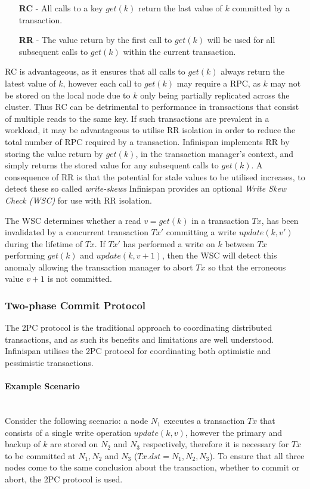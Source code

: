 	        \begin{itemize}
	            \item[\textbf{RC} -] All calls to a key $get(k)$ return the last value of $k$ committed by a transaction.  
	            \item[\textbf{RR} -] The value return by the first call to $get(k)$ will be used for all subsequent calls to $get(k)$ within the current transaction.
	        \end{itemize}   
	        
	        RC is advantageous, as it ensures that all calls to $get(k)$ always return the latest value of $k$, however each call to $get(k)$ may require a RPC, as $k$ may not be stored on the local node due to $k$ only being partially replicated across the cluster. Thus RC can be detrimental to performance in transactions that consist of multiple reads to the same key.  If such transactions are prevalent in a workload, it may be advantageous to utilise RR isolation in order to reduce the total number of RPC required by a transaction.  Infinispan implements RR by storing the value return by $get(k)$, in the transaction manager's context, and simply returns the stored value for any subsequent calls to $get(k)$.  A consequence of RR is that the potential for stale values to be utilised increases, to detect these so called \emph{write-skews}\label{write-skew} Infinispan provides an optional \emph{Write Skew Check (WSC)} for use with RR isolation.  
	        
	        The WSC determines whether a read $v = get(k)$ in a transaction $Tx$, has been invalidated by a concurrent transaction $Tx'$ committing a write $update(k, v')$ during the lifetime of $Tx$.  If $Tx'$ has performed a write on $k$ between $Tx$ performing $get(k)$ and $update(k, v+1)$, then the WSC will detect this anomaly allowing the transaction manager to abort $Tx$ so that the erroneous value $v+1$ is not committed.  

        
	    \subsubsection{Two-phase Commit Protocol}
	       The 2PC protocol is the traditional approach to coordinating distributed transactions, and as such its benefits and limitations are well understood.  Infinispan utilises the 2PC protocol for coordinating both optimistic and pessimistic transactions.  
	       
           \paragraph{Example Scenario} \label{transaction_scenario} \hspace{0pt} \\	       
           Consider the following scenario: a node $N_1$ executes a transaction $Tx$ that consists of a single write operation $update(k, v)$, however the primary and backup of $k$ are stored on $N_2$ and $N_3$ respectively, therefore it is necessary for $Tx$ to be committed at $N_1, N_2$ and $N_3$ ($Tx.dst = N_1, N_2, N_3$).  To ensure that all three nodes come to the same conclusion about the transaction, whether to commit or abort, the 2PC protocol is used.  
	       
